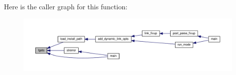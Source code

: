 Here is the caller graph for this function\+:
\nopagebreak
\begin{figure}[H]
\begin{center}
\leavevmode
\includegraphics[width=350pt]{pcretest_8txt_ab7f0ba87211e31d6160eef5650b39b52_icgraph}
\end{center}
\end{figure}


